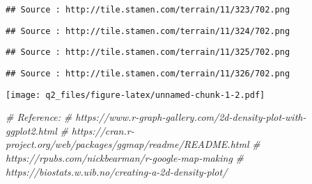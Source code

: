 \documentclass[
]{article}
\newenvironment{Shaded}{\begin{snugshade}}{\end{snugshade}}
\newcommand{\CommentTok}[1]{\textcolor[rgb]{0.56,0.35,0.01}{\textit{#1}}}
\begin{document}
\begin{verbatim}
## Source : http://tile.stamen.com/terrain/11/323/702.png
\end{verbatim}

\begin{verbatim}
## Source : http://tile.stamen.com/terrain/11/324/702.png
\end{verbatim}

\begin{verbatim}
## Source : http://tile.stamen.com/terrain/11/325/702.png
\end{verbatim}

\begin{verbatim}
## Source : http://tile.stamen.com/terrain/11/326/702.png
\end{verbatim}

\texttt{[image: q2\_files/figure-latex/unnamed-chunk-1-2.pdf]}

\begin{Shaded}
\begin{Highlighting}[]
\CommentTok{\# Reference:}
\CommentTok{\# https://www.r{-}graph{-}gallery.com/2d{-}density{-}plot{-}with{-}ggplot2.html}
\CommentTok{\# https://cran.r{-}project.org/web/packages/ggmap/readme/README.html}
\CommentTok{\# https://rpubs.com/nickbearman/r{-}google{-}map{-}making}
\CommentTok{\# https://biostats.w.uib.no/creating{-}a{-}2d{-}density{-}plot/}
\end{Highlighting}
\end{Shaded}
\end{document}
